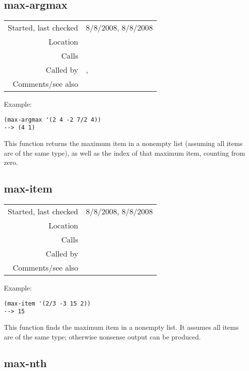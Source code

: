 \subsection*{max-argmax}\label{fun:max-argmax}

\vspace{0.3cm}
\begin{tabular}{r|p{8cm}}
Started, last checked & 8/8/2008, 8/8/2008 \\
Location & \nameref{sec:sort-by} \\
Calls & \\
Called by & \nameref{fun:sort-by-col-desc}, \nameref{fun:sort-items-desc} \\
Comments/see also & \nameref{fun:min-argmin}
\end{tabular}

\vspace{0.5cm}
\noindent Example:
\begin{verbatim}
(max-argmax '(2 4 -2 7/2 4))
--> (4 1)
\end{verbatim}

\noindent This function returns the maximum item in a
nonempty list (assuming all items are of the same
type), as well as the index of that maximum item, 
counting from zero.


\subsection*{max-item}\label{fun:max-item}

\vspace{0.3cm}
\begin{tabular}{r|p{8cm}}
Started, last checked & 8/8/2008, 8/8/2008 \\
Location & \nameref{sec:sort-by} \\
Calls & \\
Called by & \\
Comments/see also & \nameref{fun:min-item}
\end{tabular}

\vspace{0.5cm}
\noindent Example:
\begin{verbatim}
(max-item '(2/3 -3 15 2))
--> 15
\end{verbatim}

\noindent This function finds the maximum item in a
nonempty list. It assumes all items are of the same
type; otherwise nonsense output can be produced.


\subsection*{max-nth}\label{fun:max-nth}

